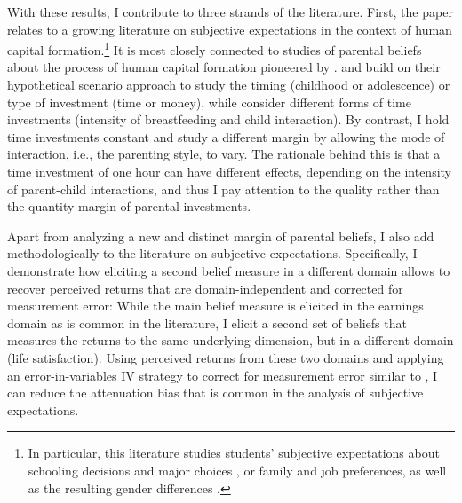 \documentclass[12pt, a4paper, english]{article}
\begin{document}
With these results, I contribute to three strands of the literature. First, the paper relates to a growing literature on subjective expectations in the context of human capital formation.\footnote{In particular, this literature studies students' subjective expectations about schooling decisions \citep{Nguyen2008,Jensen2010,AttanasioKaufmann2014,Giustinelli2016} and major choices \citep{Arcidiaconoetal2012,Beffyetal2012,Zafar2013gendergap,StinebrickerStinebricker2014collegemajor,WiswallZafar2015majorchoice,Hastingsetal2016}, or family and job preferences, as well as the resulting gender differences \citep{WiswallZafar2018Jobattributes,WiswallZafar2018family,Bergerhoffetal2018}.} It is most closely connected to studies of parental beliefs about the process of human capital formation pioneered by \citet{CunhaEloCulhane2015}. \citet{BonevaRauh2018} and \citet{Attanasioetal2018} build on their hypothetical scenario approach to study the timing (childhood or adolescence) or type of investment (time or money), while \citet{Bhalotraetal2017} consider different forms of time investments (intensity of breastfeeding and child interaction). By contrast, I hold time investments constant and study a different margin by allowing the mode of interaction, i.e., the parenting style, to vary. The rationale behind this is that a time investment of one hour can have different effects, depending on the intensity of parent-child interactions, and thus I pay attention to the quality rather than the quantity margin of parental investments. 

Apart from analyzing a new and distinct margin of parental beliefs, I also add methodologically to the literature on subjective expectations. Specifically, I demonstrate how eliciting a second belief measure in a different domain allows to recover perceived returns that are domain-independent and corrected for measurement error: While the main belief measure is elicited in the earnings domain as is common in the literature, I elicit a second set of beliefs that measures the returns to the same underlying dimension, but in a different domain (life satisfaction). Using perceived returns from these two domains and applying an error-in-variables IV strategy to correct for measurement error similar to \citet{Gillenetal2018}, I can reduce the attenuation bias that is common in the analysis of subjective expectations.
\end{document}
